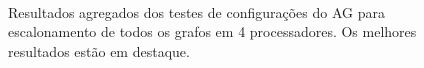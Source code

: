 \documentclass[fleqn,10pt]{SelfArx} %
\begin{document}
\begin{figure}
  \centering
   \\
  \caption{Resultados agregados dos testes de configurações do AG para escalonamento de todos os grafos em 4 processadores. Os melhores resultados estão em destaque.}
  \label{fig:results1}
\end{figure}
\end{document}
